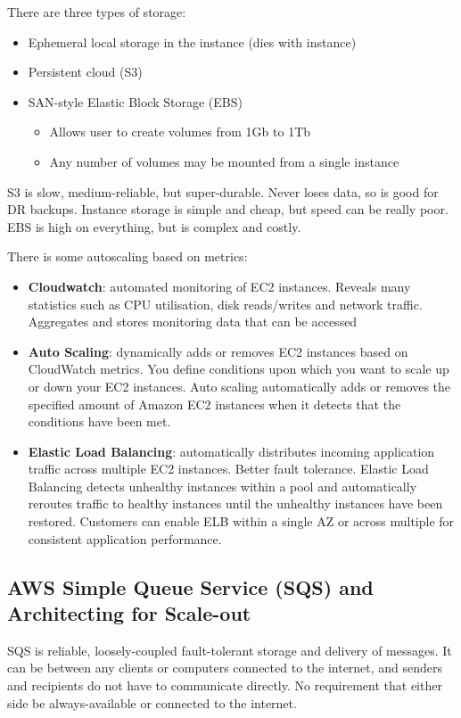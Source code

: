 \documentclass[11pt,a4paper,titlepage,dvipsnames,cmyk]{scrartcl}
\begin{document}
There are three types of storage:
\begin{itemize}
    \item Ephemeral local storage in the instance (dies with instance)
    \item Persistent cloud (S3)
    \item SAN-style Elastic Block Storage (EBS)
    \begin{itemize}
        \item Allows user to create volumes from 1Gb to 1Tb
        \item Any number of volumes may be mounted from a single instance
    \end{itemize}
\end{itemize}

S3 is slow, medium-reliable, but super-durable. Never loses data, so is good for DR backups. Instance storage is simple and cheap, but speed can be really poor. EBS is high on everything, but is complex and costly.

There is some autoscaling based on metrics:
\begin{itemize}
   \item \textbf{Cloudwatch}: automated monitoring of EC2 instances. Reveals many statistics such as CPU utilisation, disk reads/writes and network traffic. Aggregates and stores monitoring data that can be accessed
   \item \textbf{Auto Scaling}: dynamically adds or removes EC2 instances based on CloudWatch metrics. You define conditions upon which you want to scale up or down your EC2 instances. Auto scaling automatically adds or removes the specified amount of Amazon EC2 instances when it detects that the conditions have been met.
   \item \textbf{Elastic Load Balancing}: automatically distributes incoming application traffic across multiple EC2 instances. Better fault tolerance. Elastic Load Balancing detects unhealthy instances within a pool and automatically reroutes traffic to healthy instances until the unhealthy instances have been restored. Customers can enable ELB within a single AZ or across multiple for consistent application performance.
\end{itemize}

\subsection{AWS Simple Queue Service (SQS) and Architecting for Scale-out}
SQS is reliable, loosely-coupled fault-tolerant storage and delivery of messages. It can be between any clients or computers connected to the internet, and senders and recipients do not have to communicate directly. No requirement that either side be always-available or connected to the internet.
\end{document}
